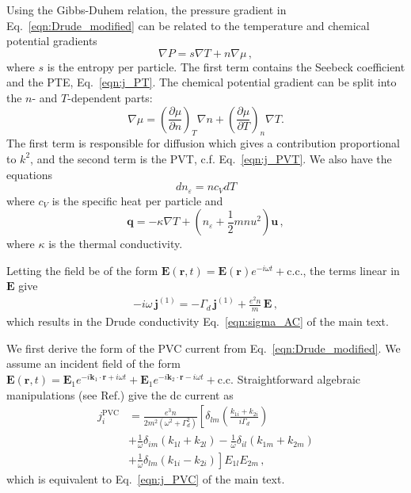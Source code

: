\documentclass[aps, prb, reprint, superscriptaddress]{revtex4-2}
\renewcommand{\vec}{\mathbf}
\begin{document}
Using the Gibbs-Duhem relation, the pressure gradient in Eq.~\eqref{eqn:Drude_modified} can be related to the temperature and chemical potential gradients 
\begin{equation}
	\nabla P = s \nabla T + n \nabla \mu\,,
	\label{eqn:P_gibbsduhem}
\end{equation}
where $s$ is the entropy per particle.
The first term contains the Seebeck coefficient and the PTE, Eq.~\eqref{eqn:j_PT}. 
The chemical potential gradient can be split into the $n$- and $T$-dependent parts: 
\begin{equation}
	\nabla\mu = \left(\frac{\partial \mu}{\partial n}\right)_{T} \nabla n+ \left(\frac{\partial \mu}{\partial T}\right)_{n}\nabla T.
	\label{eqn:mu_expansion}
\end{equation}
The first term is responsible for diffusion which gives a contribution proportional to $k^2$, and the second term is the PVT, c.f. Eq.~\eqref{eqn:j_PVT}. 
We also have the equations
\begin{equation}
	d n_\varepsilon = n c_V d T
	\label{eqn:q}
\end{equation}
where $c_V$ is the specific heat per particle and
\begin{equation}
	\vec{q} = -\kappa \nabla T
	+ \left(n_\varepsilon + \frac12 m n u^2\right) \vec{u}\,,
	\label{eqn:n_E}
\end{equation}
where $\kappa$ is the thermal conductivity.

Letting the field be of the form $\vec{E}(\vec{r}, t) = \vec{E}(\vec{r}) e^{-i\omega t} + \mathrm{c.c.}$, the terms linear in $\vec{E}$ give
\begin{align}
	-i \omega\, \vec{j}^{(1)} = -\Gamma_d\, {\vec{j}}^{(1)} + \frac{e^2 n}{m}\, \vec{E}\, ,
	\label{eqn:Drude_def}
\end{align}
which results in the Drude conductivity Eq.~\eqref{eqn:sigma_AC} of the main text. 

We first derive the form of the PVC current from  Eq.~\eqref{eqn:Drude_modified}. 
We assume an incident field of the form $\vec{E}(\vec{r}, t) = \vec{E}_1 e^{-i\vec{k}_1\cdot\vec{r} + i\omega t} + \vec{E}_1 e^{-i\vec{k}_2\cdot\vec{r} - i\omega t} + \mathrm{c.c.}$
Straightforward algebraic manipulations (see  Ref.\cite{Sun2018}) give the dc current as 
\begin{equation}
	\begin{split}
		j_i^{\mathrm{PVC}} &= \frac{e^3 n}{2 m^2(\omega^2 + \Gamma_d^2)}\left[\delta_{lm}\left(\frac{k_{1i}+ k_{2i}}{i\Gamma_d}\right)\right. \\ & \left. + \frac{1}{\omega}\delta_{im}\left(k_{1l} + k_{2l}\right)-\frac{1}{\omega}\delta_{il}\left(k_{1m} + k_{2m}\right) \right. \\ & \left. +\frac{1}{\omega}\delta_{lm}\left(k_{1i} - k_{2i}\right)\right]E_{1l}E_{2m}\, , 
	\end{split}
\end{equation}
which is equivalent to Eq.~\eqref{eqn:j_PVC} of the main text. 
\end{document}
